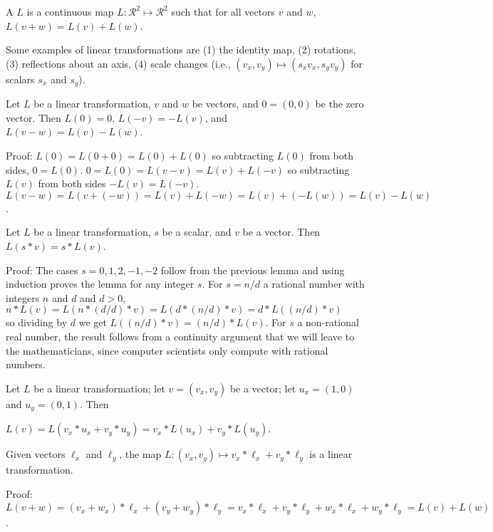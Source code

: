 \documentclass[12pt]{article}
\begin{document}
\begin{definition}\label{LINEAR-TRANSFORMATION}
A  $L$ is a continuous map
$L:\mathcal{R}^2\mapsto\mathcal{R}^2$ such that for
all vectors $v$ and $w$, $L(v+w)=L(v)+L(w)$.
\end{definition}

Some examples of linear transformations are (1) the identity map,
(2) rotations, (3) reflections about an axis, (4) scale changes
(i.e., $(v_x,v_y)\longmapsto(s_x v_x,s_y v_y)$ for scalars $s_x$
and $s_y$).


\begin{lemma}
Let $L$ be a linear transformation, $v$ and $w$ be vectors,
and $0=(0,0)$ be the zero vector.  Then $L(0)=0$,  $L(-v)=-L(v)$,
and $L(v-w) = L(v) - L(w)$.
\end{lemma}
\begin{indpar}{0.5in}
Proof: $L(0) = L(0+0)= L(0) + L(0)$ so subtracting $L(0)$
from both sides, $0=L(0)$.  $0 = L(0) = L(v-v) = L(v) + L(-v)$
so subtracting $L(v)$ from both sides $-L(v)=L(-v)$.
$L(v-w)=L(v+(-w))=L(v)+L(-w)=L(v)+(-L(w))=L(v)-L(w)$.
\end{indpar}

\begin{lemma}
Let $L$ be a linear transformation, $s$ be a scalar, and $v$ be a vector.
Then $L(s*v)=s*L(v)$.
\end{lemma}
\begin{indpar}{0.5in}
Proof: The cases $s=0,1,2,-1,-2$ follow from the previous lemma and
using induction proves the lemma for any integer $s$.  For $s=n/d$
a rational number with integers $n$ and $d$ and $d>0$, \\
\hspace*{0.1in}$n*L(v) = L(n*(d/d)*v) = L(d*(n/d)*v)=d*L((n/d)*v)$ \\
so dividing by $d$
we get $L((n/d)*v)=(n/d)*L(v)$.  For $s$ a non-rational real number,
the result follows from a continuity argument that we will leave
to the mathematicians, since computer scientists only compute
with rational numbers.
\end{indpar}

Let $L$ be a linear transformation; let $v=(v_x,v_y)$ be a vector;
let $u_x=(1,0)$ and $u_y =(0,1)$.  Then \\
\centerline{$L(v) = L(v_x*u_x+v_y*u_y)=v_x*L(u_x)+v_y*L(u_y)$.}

\begin{lemma}
Given vectors $\ell_x$ and $\ell_y$, the map
$L:(v_x,v_y)\longmapsto v_x*\ell_x+v_y*\ell_y$ is a linear
transformation.
\end{lemma}
\begin{indpar}{0.5in}
Proof: $L(v+w) = (v_x+w_x)*\ell_x+(v_y+w_y)*\ell_y
               = v_x*\ell_x+v_y*\ell_y+w_x*\ell_x+w_y*\ell_y
	       = L(v) + L(w)$.
\end{indpar}
\end{document}
